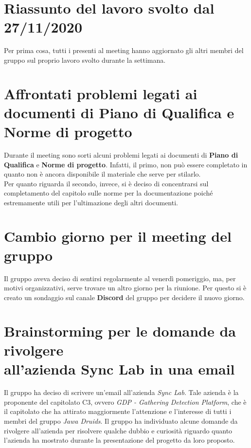 	\section{Riassunto del lavoro svolto dal 27/11/2020}
	Per prima cosa, tutti i presenti al meeting hanno aggiornato gli altri membri del gruppo sul proprio lavoro svolto durante la settimana.
	
	\section{Affrontati problemi legati ai documenti di Piano di Qualifica e Norme di progetto}
	Durante il meeting sono sorti alcuni problemi legati ai documenti di \textbf{Piano di Qualifica} e \textbf{Norme di progetto}. Infatti, il primo, non può essere completato in quanto non è ancora disponibile il materiale che serve per stilarlo. \\
	Per quanto riguarda il secondo, invece, si è deciso di concentrarsi sul completamento del capitolo sulle norme per la documentazione poiché estremamente utili per l'ultimazione degli altri documenti.
	
	\section{Cambio giorno per il meeting del gruppo}
	Il gruppo aveva deciso di sentirsi regolarmente al venerdì pomeriggio, ma, per motivi organizzativi, serve trovare un altro giorno per la riunione. Per questo si è creato un sondaggio sul canale \textbf{Discord} del gruppo per decidere il nuovo giorno.
	
	\section{Brainstorming per le domande da rivolgere \\all'azienda Sync Lab in una email} 
	Il gruppo ha deciso di scrivere un'email all'azienda \textit{Sync Lab}. Tale azienda è la proponente del capitolato C3, ovvero \textit{GDP - Gathering Detection Platform}, che è il capitolato che ha attirato maggiormente l'attenzione e l'interesse di tutti i membri del gruppo \textit{Jawa Druids}. Il gruppo ha individuato alcune domande da rivolgere all'azienda per risolvere qualche dubbio e curiosità riguardo quanto l'azienda ha mostrato durante la presentazione del progetto da loro proposto. 
	

